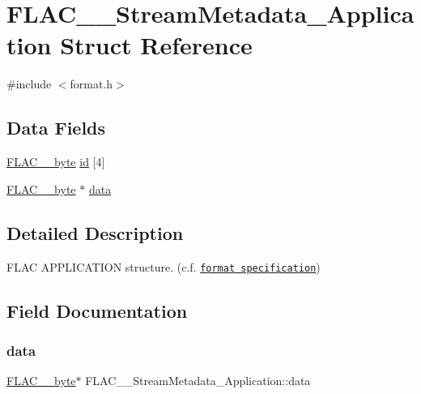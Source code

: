 \hypertarget{struct_f_l_a_c_____stream_metadata___application}{}\section{F\+L\+A\+C\+\_\+\+\_\+\+Stream\+Metadata\+\_\+\+Application Struct Reference}
\label{struct_f_l_a_c_____stream_metadata___application}


{\ttfamily \#include $<$format.\+h$>$}

\subsection*{Data Fields}
\begin{DoxyCompactItemize}
\item 
\hyperlink{ordinals_8h_a5eb569b12d5b047cdacada4d57924ee3}{F\+L\+A\+C\+\_\+\+\_\+byte} \hyperlink{struct_f_l_a_c_____stream_metadata___application_a0af01573d097b37b48b4a414318ec2ec}{id} \mbox{[}4\mbox{]}
\item 
\hyperlink{ordinals_8h_a5eb569b12d5b047cdacada4d57924ee3}{F\+L\+A\+C\+\_\+\+\_\+byte} $\ast$ \hyperlink{struct_f_l_a_c_____stream_metadata___application_a97a241798553043467ac1c94d7fe1319}{data}
\end{DoxyCompactItemize}


\subsection{Detailed Description}
F\+L\+AC A\+P\+P\+L\+I\+C\+A\+T\+I\+ON structure. (c.\+f. \href{../format.html#metadata_block_application}{\tt format specification}) 

\subsection{Field Documentation}
\mbox{\label{struct_f_l_a_c_____stream_metadata___application_a97a241798553043467ac1c94d7fe1319}} 
\subsubsection{\texorpdfstring{data}{data}}
{\footnotesize\ttfamily \hyperlink{ordinals_8h_a5eb569b12d5b047cdacada4d57924ee3}{F\+L\+A\+C\+\_\+\+\_\+byte}$\ast$ F\+L\+A\+C\+\_\+\+\_\+\+Stream\+Metadata\+\_\+\+Application\+::data}

